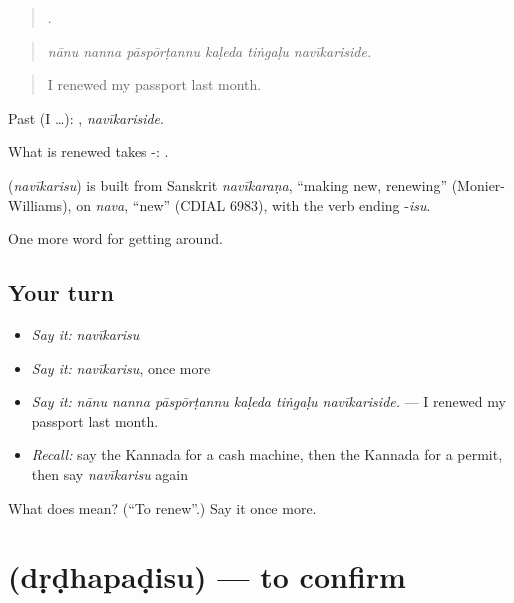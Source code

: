 \begin{quote}
     .
\end{quote}

\begin{quote}
\emph{nānu nanna pāspōrṭannu kaḷeda tiṅgaḷu navīkariside.}
\end{quote}

\begin{quote}
I renewed my passport last month.
\end{quote}

Past (I …): , \emph{navīkariside}.

What is renewed takes -:  .

\begin{cousinweb}
\textbf{} (\emph{navīkarisu}) is built from Sanskrit \emph{navīkaraṇa}, \textquotedblleft{}making new, renewing\textquotedblright{} (Monier-Williams), on \emph{nava}, \textquotedblleft{}new\textquotedblright{} (CDIAL 6983), with the verb ending -\emph{isu}.
\end{cousinweb}

\begin{grammarlens}[title={What you've built}]
One more word for getting around.
\end{grammarlens}

\subsection*{Your turn}
\begin{itemize}
\raggedright
  \item \emph{Say it:} \emph{navīkarisu}
  \item \emph{Say it:} \emph{navīkarisu}, once more
  \item \emph{Say it:} \emph{nānu nanna pāspōrṭannu kaḷeda tiṅgaḷu navīkariside.} — I renewed my passport last month.
  \item \emph{Recall:} say the Kannada for a cash machine, then the Kannada for a permit, then say \emph{navīkarisu} again
\end{itemize}

\begin{tcolorbox}[breakable,colback=teal!4,colframe=teal!35!black,title={Before you move on}]
What does  mean? (\textquotedblleft{}To renew\textquotedblright{}.) Say it once more.
\end{tcolorbox}
\section[\texorpdfstring{\kn{ದೃಢಪಡಿಸು} (dṛḍhapaḍisu)}{ದೃಢಪಡಿಸು (dṛḍhapaḍisu)}]{ (dṛḍhapaḍisu) — to confirm}

